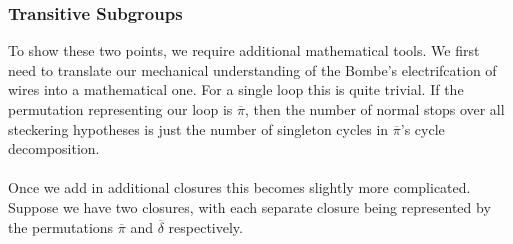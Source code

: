 \subsubsection{Transitive Subgroups}
\noindent To show these two points, we require additional
mathematical tools. We first need to translate our mechanical
understanding of the Bombe's electrifcation of wires into a
mathematical one. For a single loop this is quite trivial. If the
permutation representing our loop is $\overline\pi$, then the number
of normal stops over all steckering hypotheses is just the number of
singleton cycles in $\overline\pi$'s cycle decomposition.
\\\\Once we add in additional closures this becomes slightly more
complicated. Suppose we have two closures, with each separate closure
being represented by the permutations $\overline\pi$ and
$\overline\delta$ respectively.
